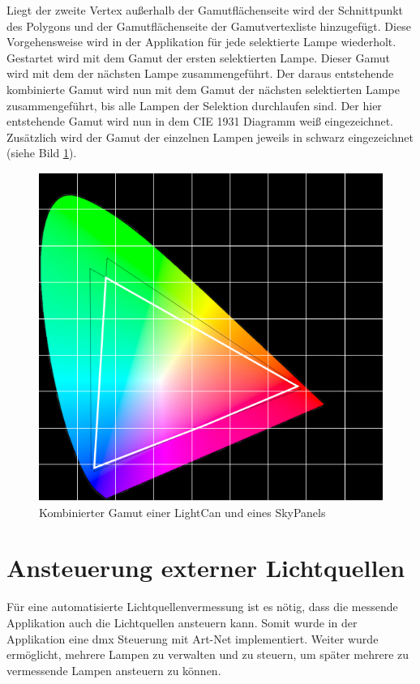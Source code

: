 \documentclass[11pt]{scrartcl}
\begin{document}
\noindent
Liegt der zweite Vertex außerhalb der Gamutflächenseite wird der Schnittpunkt des Polygons und der Gamutflächenseite der Gamutvertexliste hinzugefügt.
Diese Vorgehensweise wird in der Applikation für jede selektierte Lampe wiederholt. Gestartet wird mit dem Gamut der ersten selektierten Lampe. Dieser
Gamut wird mit dem der nächsten Lampe zusammengeführt. Der daraus entstehende kombinierte Gamut wird nun mit dem Gamut der nächsten selektierten Lampe
zusammengeführt, bis alle Lampen der Selektion durchlaufen sind. Der hier entstehende Gamut wird nun in dem CIE 1931 Diagramm weiß eingezeichnet.
Zusätzlich wird der Gamut der einzelnen Lampen jeweils in schwarz eingezeichnet (siehe Bild \ref{fig:combinedGamut}).
\begin{figure}[H]
    \begin{center}
        \includegraphics[width=\textwidth]{images/combined_gamut_lightCan_skypanel.png} %
    \end{center}
    \caption{Kombinierter Gamut einer LightCan und eines SkyPanels}\label{fig:combinedGamut}
\end{figure}
\noindent
\clearpage

\section{Ansteuerung externer Lichtquellen}
Für eine automatisierte Lichtquellenvermessung ist es nötig, dass die messende Applikation auch die Lichtquellen ansteuern kann. Somit wurde
in der Applikation eine \ac{dmx} Steuerung mit Art-Net implementiert. Weiter wurde ermöglicht, mehrere Lampen zu verwalten und zu steuern, um später mehrere
zu vermessende Lampen ansteuern zu können.
\end{document}
